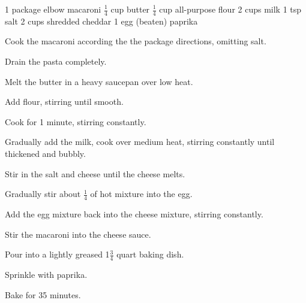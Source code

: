 \dishtype{\side}
\dishother{\vegetarian}
\begin{ingreds}
    1 package elbow macaroni
    $\frac{1}{4}$ cup butter
    $\frac{1}{4}$ cup all-purpose flour
    2 cups milk
    1 tsp salt
    2 cups shredded cheddar
    1 egg (beaten)
    paprika
\end{ingreds}
\begin{method}
    Cook the macaroni according the the package directions, omitting salt.\par
    Drain the pasta completely.\par
    Melt the butter in a heavy saucepan over low heat.\par
    Add flour, stirring until smooth.\par
    Cook for 1 minute, stirring constantly.\par
    Gradually add the milk, cook over medium heat, stirring constantly until thickened and bubbly.\par
    Stir in the salt and cheese until the cheese melts.\par
    Gradually stir about $\frac{1}{4}$ of hot mixture into the egg.\par
    Add the egg mixture back into the cheese mixture, stirring constantly.\par
    Stir the macaroni into the cheese sauce.\par
    Pour into a lightly greased 1$\frac{3}{4}$ quart baking dish.\par
    Sprinkle with paprika.\par
    Bake for 35 minutes.
\end{method}